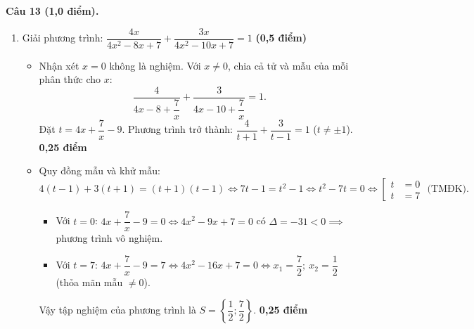 \documentclass[12pt,a4paper]{article}
\begin{document}
\noindent\textbf{Câu 13 (1,0 điểm).}
\begin{enumerate}[label=\arabic*), leftmargin=18pt, itemsep=2.5pt, parsep=0pt]
  \item Giải phương trình: $\dfrac{4x}{4x^2 - 8x + 7} + \dfrac{3x}{4x^2 - 10x + 7} = 1$ \hfill \textbf{(0,5 điểm)}
  \begin{itemize}[leftmargin=16pt, itemsep=1.5pt, parsep=0pt]
    \item Nhận xét $x = 0$ không là nghiệm. Với $x \neq 0$, chia cả tử và mẫu của mỗi phân thức cho $x$:
    \[
      \frac{4}{4x - 8 + \dfrac{7}{x}} + \frac{3}{4x - 10 + \dfrac{7}{x}} = 1.
    \]
    Đặt $t = 4x + \dfrac{7}{x} - 9$. Phương trình trở thành: $\dfrac{4}{t + 1} + \dfrac{3}{t - 1} = 1$ ($t \neq \pm 1$). \dotfill \textbf{0,25 điểm}
    \item Quy đồng mẫu và khử mẫu:
    \[
      4(t - 1) + 3(t + 1) = (t + 1)(t - 1) \iff 7t - 1 = t^2 - 1 \iff t^2 - 7t = 0 \iff \left[\begin{aligned} t &= 0 \\ t &= 7 \end{aligned}\right. \text{ (TMĐK)}.
    \]
    \begin{itemize}[leftmargin=12pt, itemsep=1pt]
      \item Với $t = 0$: $4x + \dfrac{7}{x} - 9 = 0 \iff 4x^2 - 9x + 7 = 0$ có $\Delta = -31 < 0 \implies$ phương trình vô nghiệm.
      \item Với $t = 7$: $4x + \dfrac{7}{x} - 9 = 7 \iff 4x^2 - 16x + 7 = 0 \iff x_1 = \dfrac{7}{2}; \ x_2 = \dfrac{1}{2}$ (thỏa mãn mẫu $\neq 0$).
    \end{itemize}
    Vậy tập nghiệm của phương trình là $S = \left\{\dfrac{1}{2}; \dfrac{7}{2}\right\}$. \dotfill \textbf{0,25 điểm}
  \end{itemize}


\end{enumerate}
\end{document}
